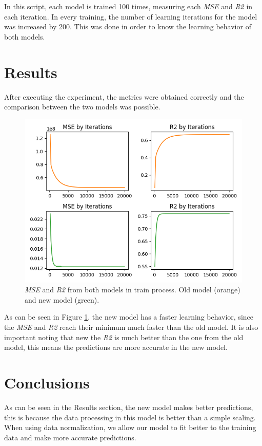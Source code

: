 \documentclass[11pt]{article}
\begin{document}
    In this script, each model is trained 100 times, measuring each \textit{MSE} and \textit{R2} in each iteration. In
    every training, the number of learning iterations for the model was increased by 200. This was done in order to
    know the learning behavior of both models.

\section{Results}\label{sec:results}
    After executing the experiment, the metrics were obtained correctly and the comparison between the two models was
    possible.
    \begin{figure}[h]
        \includegraphics{figures}
        \caption{
            \textit{MSE} and \textit{R2} from both models in train process. Old model (orange) and new model (green).
        }
        \label{fig:results}
    \end{figure}

    As can be seen in Figure \ref{fig:results}, the new model has a faster learning behavior, since the \textit{MSE} and
    \textit{R2} reach their minimum much faster than the old model. It is also important noting that new the \textit{R2}
    is much better than the one from the old model, this means the predictions are more accurate in the new model.

\section{Conclusions}
    As can be seen in the Results section, the new model makes better predictions, this is because the data processing
    in this model is better than a simple scaling. When using data normalization, we allow our model to fit better to
    the training data and make more accurate predictions.
\end{document}
